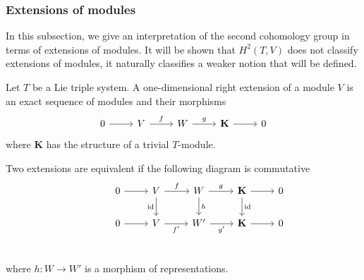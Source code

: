 \documentclass[11pt, twoside]{article}
\begin{document}
\subsubsection{Extensions of modules}

In this subsection, we give an interpretation of the second cohomology group in terms of extensions of modules. It will be shown that $H^2(T,V) $ does not classify extensions of modules, it naturally classifies a weaker notion that will be defined.

\begin{defi}
    Let $T$ be a Lie triple system. A one-dimensional right extension of a module $V$ is an exact sequence of modules and their morphisms \[\begin{tikzcd}
	0 & V & W & {\mathbf{K}} & 0
	\arrow[from=1-1, to=1-2]
	\arrow["f", from=1-2, to=1-3]
	\arrow["g", from=1-3, to=1-4]
	\arrow[from=1-4, to=1-5]
\end{tikzcd}\] where $\mathbf{K}$ has the structure of a trivial $T$-module.
\end{defi}

Two extensions are equivalent if the following diagram is commutative \[\begin{tikzcd}
	& 0 & V & W & {\mathbf{K}} & 0 \\
	& 0 & V & {W'} & {\mathbf{K}} & 0 \\
	{}
	\arrow[from=1-2, to=1-3]
	\arrow["f", from=1-3, to=1-4]
	\arrow["{\mathrm{id}}"', from=1-3, to=2-3]
	\arrow["g", from=1-4, to=1-5]
	\arrow["h", from=1-4, to=2-4]
	\arrow[from=1-5, to=1-6]
	\arrow["{\mathrm{id}}", from=1-5, to=2-5]
	\arrow[from=2-2, to=2-3]
	\arrow["{f'}"', from=2-3, to=2-4]
	\arrow["{g'}"', from=2-4, to=2-5]
	\arrow[from=2-5, to=2-6]
\end{tikzcd}\] where $h:W\to W'$ is a morphism of representations. 
\end{document}
